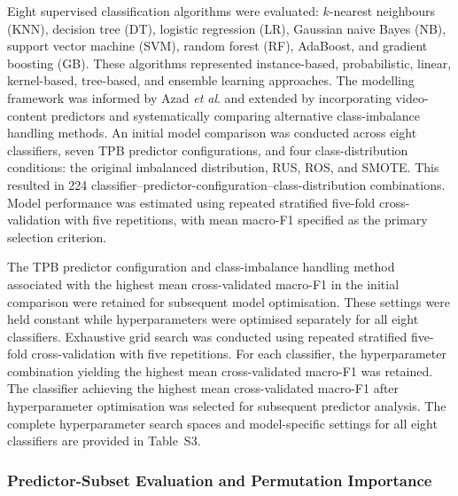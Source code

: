 \documentclass[jtaer,article,submit,moreauthors]{Definitions/mdpi}
\begin{document}
Eight supervised classification algorithms were evaluated:
\(k\)-nearest neighbours (KNN), decision tree (DT), logistic regression
(LR), Gaussian naive Bayes (NB), support vector machine (SVM), random
forest (RF), AdaBoost, and gradient boosting (GB). These algorithms
represented instance-based, probabilistic, linear, kernel-based,
tree-based, and ensemble learning approaches. The modelling framework
was informed by Azad \textit{et al}. \cite{Azad2023} and extended by
incorporating video-content predictors and systematically comparing
alternative class-imbalance handling methods.
An initial model comparison was conducted across eight classifiers,
seven TPB predictor configurations, and four class-distribution
conditions: the original imbalanced distribution, RUS, ROS, and SMOTE. This resulted in 224
classifier--predictor-configuration--class-distribution combinations.
Model performance was estimated using repeated stratified five-fold
cross-validation with five repetitions, with mean macro-F1 specified
as the primary selection criterion.

The TPB predictor configuration and class-imbalance handling method
associated with the highest mean cross-validated macro-F1 in the
initial comparison were retained for subsequent model optimisation.
These settings were held constant while hyperparameters were optimised
separately for all eight classifiers. Exhaustive grid search was
conducted using repeated stratified five-fold cross-validation with
five repetitions. For each classifier, the hyperparameter combination
yielding the highest mean cross-validated macro-F1 was retained. The
classifier achieving the highest mean cross-validated macro-F1 after
hyperparameter optimisation was selected for subsequent predictor
analysis. The complete hyperparameter search spaces and model-specific settings
for all eight classifiers are provided in Table~S3.

\subsubsection{Predictor-Subset Evaluation and Permutation Importance}
\end{document}
